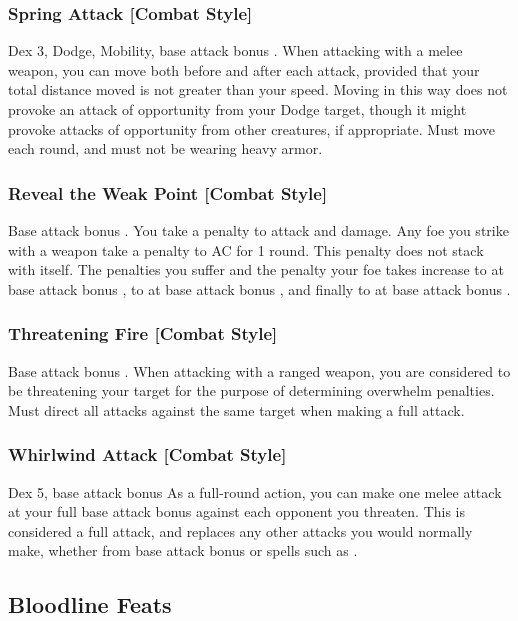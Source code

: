 \subsubsection{Spring Attack [Combat Style]}
 Dex 3, Dodge, Mobility, base attack bonus .
 When attacking with a melee weapon, you can move both before and after each attack, provided that your total distance moved is not greater than your speed. Moving in this way does not provoke an attack of opportunity from your Dodge target, though it might provoke attacks of opportunity from other creatures, if appropriate.
 Must move each round, and must not be wearing heavy armor.

\subsubsection{Reveal the Weak Point [Combat Style]}
\featpre Base attack bonus .
 You take a  penalty to attack and damage. Any foe you strike with a weapon take a  penalty to AC for 1 round. This penalty does not stack with itself. The penalties you suffer and the penalty your foe takes increase to  at base attack bonus , to  at base attack bonus , and finally to  at base attack bonus .

\subsubsection{Threatening Fire [Combat Style]}
 Base attack bonus .
 When attacking with a ranged weapon, you are considered to be threatening your target for the purpose of determining overwhelm penalties.
 Must direct all attacks against the same target when making a full attack.

\subsubsection{Whirlwind Attack [Combat Style]}
 Dex 5, base attack bonus 
 As a full-round action, you can make one melee attack at your full base attack bonus against each opponent you threaten. This is considered a full attack, and replaces any other attacks you would normally make, whether from base attack bonus or spells such as .

\subsection{Bloodline Feats}

